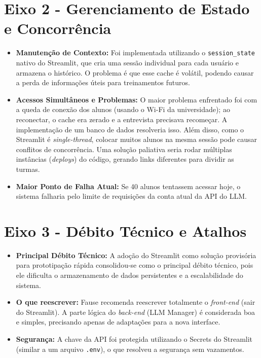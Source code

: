 \begin{apendicesenv}
\section*{Eixo 2 - Gerenciamento de Estado e Concorrência}

\begin{itemize}
  \item \textbf{Manutenção de Contexto:} Foi implementada utilizando o \texttt{session\_state} nativo do Streamlit, que cria uma sessão individual para cada usuário e armazena o histórico. O problema é que esse cache é volátil, podendo causar a perda de informações úteis para treinamentos futuros.
  \item \textbf{Acessos Simultâneos e Problemas:} O maior problema enfrentado foi com a queda de conexão dos alunos (usando o Wi-Fi da universidade); ao reconectar, o cache era zerado e a entrevista precisava recomeçar. A implementação de um banco de dados resolveria isso. Além disso, como o Streamlit é \textit{single-thread}, colocar muitos alunos na mesma sessão pode causar conflitos de concorrência. Uma solução paliativa seria rodar múltiplas instâncias (\textit{deploys}) do código, gerando links diferentes para dividir as turmas.
  \item \textbf{Maior Ponto de Falha Atual:} Se 40 alunos tentassem acessar hoje, o sistema falharia pelo limite de requisições da conta atual da API do LLM.
\end{itemize}

\section*{Eixo 3 - Débito Técnico e Atalhos}

\begin{itemize}
  \item \textbf{Principal Débito Técnico:} A adoção do Streamlit como solução provisória para prototipação rápida consolidou-se como o principal débito técnico, pois ele dificulta o armazenamento de dados persistentes e a escalabilidade do sistema.
  \item \textbf{O que reescrever:} Fause recomenda reescrever totalmente o \textit{front-end} (sair do Streamlit). A parte lógica do \textit{back-end} (LLM Manager) é considerada boa e simples, precisando apenas de adaptações para a nova interface.
  \item \textbf{Segurança:} A chave da API foi protegida utilizando o Secrets do Streamlit (similar a um arquivo \texttt{.env}), o que resolveu a segurança sem vazamentos.
\end{itemize}


\end{apendicesenv}
